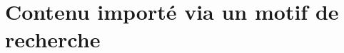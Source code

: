 \documentclass[varwidth, border = 3pt]{standalone}
\begin{document}
\section*{Contenu importé via un motif de recherche}

%
%
%
\end{document}
